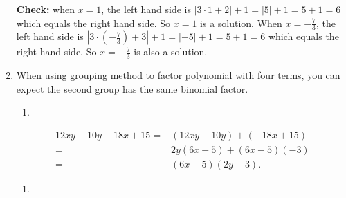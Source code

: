 \documentclass[
  12pt]{article}
\providecommand{\tightlist}{%
  \setlength{\itemsep}{0pt}\setlength{\parskip}{0pt}}\usepackage{longtable,booktabs,array}
\begin{document}
\begin{enumerate}
  \textbf{Check:} when \(x=1\), the left hand side is
  \(|3\cdot 1 + 2|+1=|5|+1=5+1=6\) which equals the right hand side. So
  \(x=1\) is a solution. When \(x=-\frac73\), the left hand side is
  \(|3\cdot(-\frac73)+3|+1=|-5|+1=5+1=6\) which equals the right hand
  side. So \(x=-\frac73\) is also a solution.
\item
  When using grouping method to factor polynomial with four terms, you
  can expect the second group has the same binomial factor.

  \begin{enumerate}
  \def\labelenumii{\arabic{enumii}.}
  \tightlist
  \item
  \end{enumerate}

  \[
   \begin{aligned}
   12xy-10y-18x+15=&(12xy-10y)+(-18x+15)\\
   =&2y(6x-5)+(6x-5)(-3)\\
   =&(6x-5)(2y-3).
   \end{aligned}
   \]

  \begin{enumerate}
  \def\labelenumii{\arabic{enumii}.}
  \setcounter{enumii}{1}
  \tightlist
  \item
  \end{enumerate}


\end{enumerate}
\end{document}
